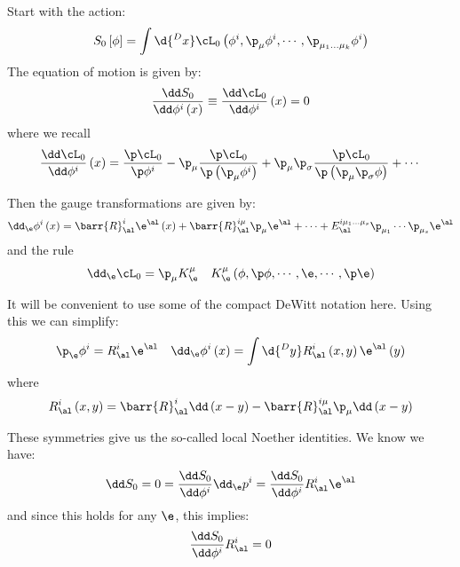 \documentclass{booc}
\begin{document}
Start with the action:
\begin{align}
S_0\left[ \phi \right] = \int \d{^D x} \cL_0\left( \phi^i , \p_\mu\phi^i ,\cdots , 
\p_{\mu_1 \ldots \mu_k} \phi^i\right)
\end{align}
The equation of motion is given by:
\begin{equation}
\frac{\dd S_0}{\dd \phi^i\left( x \right)} \equiv
\frac{\dd \cL_0}{\dd \phi^i}\left( x \right) = 0
\end{equation}
where we recall
\begin{equation}
\frac{\dd \cL_0}{\dd \phi^i} \left( x \right) = 
\frac{\p \cL_0}{\p \phi^i} - \p_\mu 
\frac{\p \cL_0}{\p\left( \p_\mu \phi^i \right)} + 
\p_\mu \p_\sigma \frac{\p \cL_0}{\p\left( \p_\mu \p_\sigma \phi \right)} + \cdots
\end{equation}

Then the gauge transformations are given by:
\begin{equation}
\dd_{\e} \phi^i\left( x \right) = 
\barr{R}_\al^i \e^\al\left( x \right) + \barr{R}_\al^{i\mu} \p_\mu \e^\al + \cdots
+ E_\al^{i \mu_1 \ldots \mu_s} \p_{\mu_1} \cdots \p_{\mu_s} \e^\al
\end{equation}
and the rule
\begin{align}
\dd_\e \cL_0 = \p_\mu K_\e^\mu
&&
K^\mu_\e\left( \phi , \p \phi , \cdots , \e , \cdots ,  \p \e \right)
\end{align}

It will be convenient to use some of the compact DeWitt notation here.
Using this we can simplify:
\begin{align}
\p_\e \phi^i= R_\al^i \e^\al
&&
\dd_\e \phi^i\left( x \right) = \int \d{^D y} R^i_\al\left( x, y \right) \e^\al \left( y \right)
\end{align}
where
\begin{equation}
R^i_\al \left( x  ,y \right)  = 
\barr{R}_\al^i \dd\left( x - y \right) - \barr{R}_\al^{i\mu}\p_\mu \dd\left( x - y \right)
\end{equation}

These symmetries give us the so-called local Noether
identities.
We know we have:
\begin{equation}
\dd S_0 = 0 = \frac{\dd S_0}{\dd\phi^i}
\dd_\e p^i = 
\frac{\dd S_0}{\dd \phi^i} R^i_\al \e^\al
\end{equation}
and since this holds for any $\e$, this implies:
\begin{equation}
\frac{\dd S_0}{\dd\phi^i} R^i_\al = 0
\label{eqn:noether_id}
\end{equation}
\end{document}
